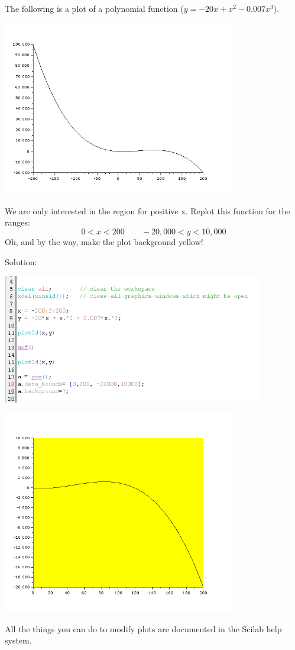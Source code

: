 \begin{Example}
The following is a plot of a polynomial function ($y=-20x+x^2-0.007x^3$). 

\includegraphics[width=4.0in]{figs08/polynom_01.png}

We are only 
interested in the region for positive x.  Replot this function for the ranges:
\[
0 < x < 200 \qquad -20,000 < y < 10,000
\]
Oh, and by the way, make the plot background yellow!

Solution:

\includegraphics[width=4.5in]{figs08/poly_plot_script.png}


\includegraphics[width=4.0in]{figs08/polynom_02.png}


\end{Example}
All the things you can do to modify plots are documented in the Scilab help system. 


